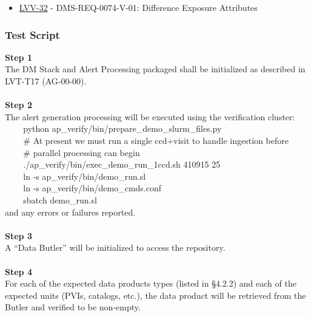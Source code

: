 \begin{itemize}
\tightlist
\item
  \href{https://jira.lsstcorp.org/browse/LVV-32}{LVV-32} -
  DMS-REQ-0074-V-01: Difference Exposure Attributes
\end{itemize}

\hypertarget{test-script-127}{%
\subsubsection{Test Script}\label{test-script-127}}

\textbf{Step 1}\\
The DM Stack and Alert Processing packaged shall be initialized as
described in LVT-T17 (AG-00-00).\\
~\\
\textbf{Step 2}\\
The alert generation processing will be executed using the verification
cluster:\\
\hspace*{0.333em} ~ ~ ~python
ap\_verify/bin/prepare\_demo\_slurm\_files.py\\
\hspace*{0.333em} ~ ~ ~\# At present we must run a single ccd+visit to
handle ingestion before\\
\hspace*{0.333em} ~ ~ ~\# parallel processing can begin\\
\hspace*{0.333em} ~ ~ ~./ap\_verify/bin/exec\_demo\_run\_1ccd.sh 410915
25\\
\hspace*{0.333em} ~ ~ ~ln -s ap\_verify/bin/demo\_run.sl\\
\hspace*{0.333em} ~ ~ ~ln -s ap\_verify/bin/demo\_cmds.conf\\
\hspace*{0.333em} ~ ~ ~sbatch demo\_run.sl\\
and any errors or failures reported.\\
~\\
\textbf{Step 3}\\
A ``Data Butler'' will be initialized to access the repository.\\
~\\
\textbf{Step 4}\\
For each of the expected data products types (listed in §4.2.2) and each
of the expected units (PVIs, catalogs, etc.), the data product will be
retrieved from the Butler and verified to be non-empty.\\
